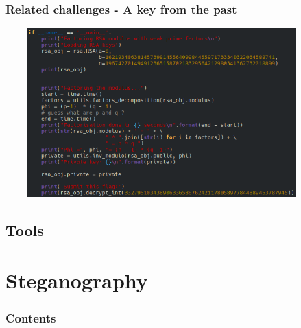 \documentclass[]{beamer}
\begin{document}
\begin{frame}
\frametitle{Related challenges - A key from the past}
\begin{center}
    \includegraphics[height=6.5cm, width=12.0cm]{./images/RSA-weak-prime-factors.png}
\end{center}
\end{frame}




\subsection{Tools}



%
%
\section{Steganography}
\begin{frame}
    \frametitle{Contents}
    \begin{columns}[t]
        \begin{column}{5cm}
            \tableofcontents[sections={1-3}, currentsection, hideothersubsections]
        \end{column}
        \begin{column}{5cm}
            \tableofcontents[sections={4-5}, currentsection, hideothersubsections]
        \end{column}
    \end{columns}
\end{frame}
\end{document}
